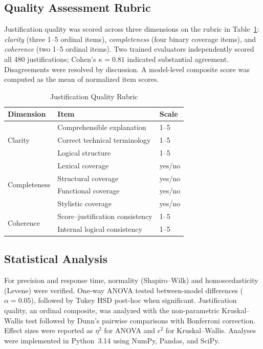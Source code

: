 \documentclass[twocolumn,11pt]{article}
\begin{document}
    \subsection{Quality Assessment Rubric}
    Justification quality was scored across three dimensions on the rubric in Table~\ref{tab:rubric}: \emph{clarity} (three 1--5 ordinal items), \emph{completeness} (four binary coverage items), and \emph{coherence} (two 1--5 ordinal items). Two trained evaluators independently scored all 480 justifications; Cohen's $\kappa = 0.81$ indicated substantial agreement. Disagreements were resolved by discussion. A model-level composite score was computed as the mean of normalized item scores.
    \begin{table}[!t]
    \caption{Justification Quality Rubric}\label{tab:rubric}
    \centering\small
    \begin{tabular}{@{}lll@{}}\toprule
    Dimension & Item & Scale\\\midrule
    \multirow{3}{*}{Clarity} & Comprehensible explanation & 1--5 \\ & Correct technical terminology & 1--5 \\ & Logical structure & 1--5 \\
    \multirow{4}{*}{Completeness} & Lexical coverage & yes/no \\ & Structural coverage & yes/no \\ & Functional coverage & yes/no \\ & Stylistic coverage & yes/no \\
    \multirow{2}{*}{Coherence} & Score--justification consistency & 1--5 \\ & Internal logical consistency & 1--5 \\\bottomrule
    \end{tabular}
    \end{table}
    \subsection{Statistical Analysis}
    For precision and response time, normality (Shapiro--Wilk) and homoscedasticity (Levene) were verified. One-way ANOVA tested between-model differences ($\alpha = 0.05$), followed by Tukey HSD post-hoc when significant. Justification quality, an ordinal composite, was analyzed with the non-parametric Kruskal--Wallis test followed by Dunn's pairwise comparisons with Bonferroni correction. Effect sizes were reported as $\eta^2$ for ANOVA and $\epsilon^2$ for Kruskal--Wallis. Analyses were implemented in Python~3.14 using NumPy, Pandas, and SciPy.
\end{document}
